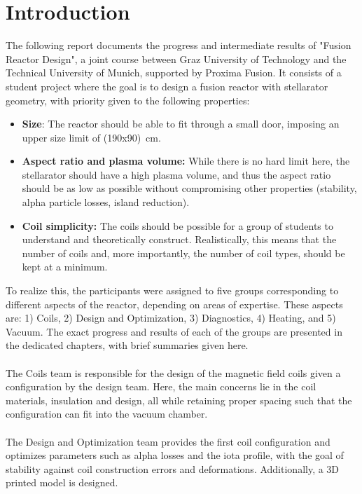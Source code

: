 \section{Introduction}
The following report documents the progress and intermediate results of "Fusion Reactor Design", a joint course between Graz University of Technology and the Technical University of Munich, supported by Proxima Fusion. It consists of a student project where the goal is to design a fusion reactor with stellarator geometry, with priority given to the following properties:
\begin{itemize}
    \item \textbf{Size}: The reactor should be able to fit through a small door, imposing an upper size limit of (190x90)~cm.
    \item \textbf{Aspect ratio and plasma volume:} While there is no hard limit here, the stellarator should have a high plasma volume, and thus the aspect ratio should be as low as possible without compromising other properties (stability, alpha particle losses, island reduction).
    \item \textbf{Coil simplicity:} The coils should be possible for a group of students to understand and theoretically construct. Realistically, this means that the number of coils and, more importantly, the number of coil types, should be kept at a minimum.

\end{itemize}
To realize this, the participants were assigned to five groups corresponding to different aspects of the reactor, depending on areas of expertise. These aspects are: 1) Coils, 2) Design and Optimization, 3) Diagnostics, 4) Heating, and 5) Vacuum. The exact progress and results of each of the groups are presented in the dedicated chapters, with brief summaries given here.\\
\\
The Coils team is responsible for the design of the magnetic field coils given a configuration by the design team. Here, the main concerns lie in the coil materials, insulation and design, all while retaining proper spacing such that the configuration can fit into the vacuum chamber.\\
\\
The Design and Optimization team provides the first coil configuration and optimizes parameters such as alpha losses and the iota profile, with the goal of stability against coil construction errors and deformations. Additionally, a 3D printed model is designed.\\
